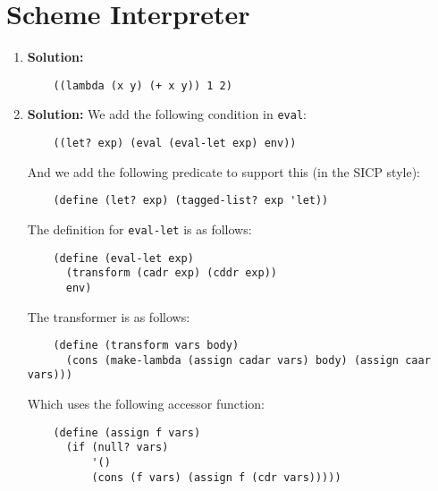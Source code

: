 \documentclass{article}
\begin{document}
\section{Scheme Interpreter}
\begin{enumerate}
    \item \textbf{Solution:}
    \begin{verbatim}
    ((lambda (x y) (+ x y)) 1 2)
    \end{verbatim}
    \vspace{-1em}
    \item \textbf{Solution:}
    We add the following condition in \texttt{eval}:
    \begin{verbatim}
    ((let? exp) (eval (eval-let exp) env))
    \end{verbatim}
    \vspace{-1em}
    And we add the following predicate to support this (in the SICP style):
    \begin{verbatim}
    (define (let? exp) (tagged-list? exp 'let))
    \end{verbatim}
    \vspace{-1em}
    The definition for \texttt{eval-let} is as follows:
    \begin{verbatim}
    (define (eval-let exp)
      (transform (cadr exp) (cddr exp))
      env)
    \end{verbatim}
    \vspace{-1em}
    The transformer is as follows:
    \begin{verbatim}
    (define (transform vars body)
      (cons (make-lambda (assign cadar vars) body) (assign caar vars)))
    \end{verbatim}
    \vspace{-1em}
    Which uses the following accessor function:
    \begin{verbatim}
    (define (assign f vars)
      (if (null? vars)
          '()
          (cons (f vars) (assign f (cdr vars)))))
    \end{verbatim}
    \vspace{-1em}
    
\end{enumerate}
\end{document}
